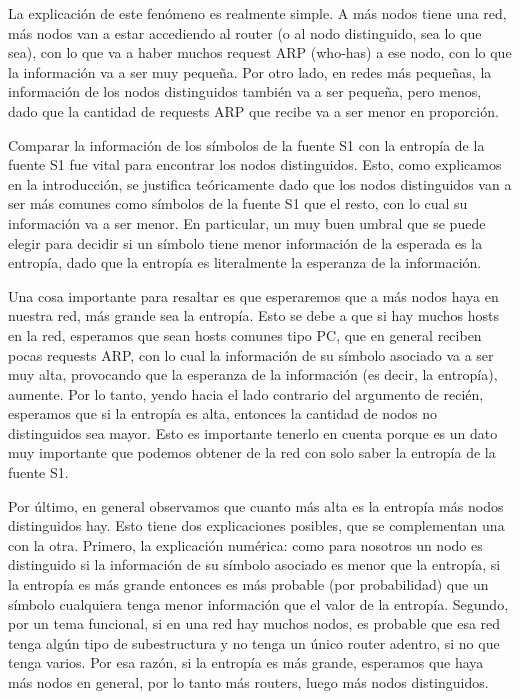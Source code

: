 La explicación de este fenómeno es realmente simple. A más nodos tiene una red, más nodos van a estar accediendo al router (o al nodo distinguido, sea lo que sea), con lo que va a haber muchos request ARP (who-has) a ese nodo, con lo que la información va a ser muy pequeña. Por otro lado, en redes más pequeñas, la información de los nodos distinguidos también va a ser pequeña, pero menos, dado que la cantidad de requests ARP que recibe va a ser menor en proporción.


Comparar la información de los símbolos de la fuente S1 con la entropía de la fuente S1 fue vital para encontrar los nodos distinguidos. Esto, como explicamos en la introducción, se justifica teóricamente dado que los nodos distinguidos van a ser más comunes como símbolos de la fuente S1 que el resto, con lo cual su información va a ser menor. En particular, un muy buen umbral que se puede elegir para decidir si un símbolo tiene menor información de la esperada es la entropía, dado
que la entropía es literalmente la esperanza de la información.

Una cosa importante para resaltar es que esperaremos que a más nodos haya en nuestra red, más grande sea la entropía. Esto se debe a que si hay muchos hosts en la red, esperamos que sean hosts comunes tipo PC, que en general reciben pocas requests ARP, con lo cual la información de su símbolo asociado va a ser muy alta, provocando que la esperanza de la información (es decir, la entropía), aumente. Por lo tanto, yendo hacia el lado contrario del argumento de recién, esperamos que
si la entropía es alta, entonces la cantidad de nodos no distinguidos sea mayor.
Esto es importante tenerlo en cuenta porque es un dato muy importante que podemos obtener de la red con solo saber la entropía de la fuente S1.

Por último, en general observamos que cuanto más alta es la entropía más nodos distinguidos hay. Esto tiene dos explicaciones posibles, que se complementan una con la otra.
Primero, la explicación numérica: como para nosotros un nodo es distinguido si la información de su símbolo asociado es menor que la entropía, si la entropía es más grande entonces es más probable (por probabilidad) que un símbolo cualquiera tenga menor información que el valor de la entropía.
Segundo, por un tema funcional, si en una red hay muchos nodos, es probable que esa red tenga algún tipo de subestructura y no tenga un único router adentro, si no que tenga varios. Por esa razón, si la entropía es más grande, esperamos que haya más nodos en general, por lo tanto más routers, luego más nodos distinguidos.


